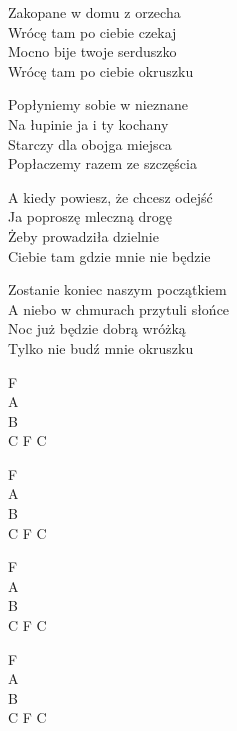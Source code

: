\begin{text}
    Zakopane w domu z orzecha\\
    Wrócę tam po ciebie czekaj\\
    Mocno bije twoje serduszko\\
    Wrócę tam po ciebie okruszku

    Popłyniemy sobie w nieznane\\
    Na łupinie ja i ty kochany\\
    Starczy dla obojga miejsca\\
    Popłaczemy razem ze szczęścia

    A kiedy powiesz, że chcesz odejść\\
    Ja poproszę mleczną drogę\\
    Żeby prowadziła dzielnie\\
    Ciebie tam gdzie mnie nie będzie

    Zostanie koniec naszym początkiem\\
    A niebo w chmurach przytuli słońce\\
    Noc już będzie dobrą wróżką\\
    Tylko nie budź mnie okruszku
\end{text}
\begin{chord}
    F\\
    A\\
    B\\
    C F C

    F\\
    A\\
    B\\
    C F C

    F\\
    A\\
    B\\
    C F C

    F\\
    A\\
    B\\
    C F C
\end{chord}